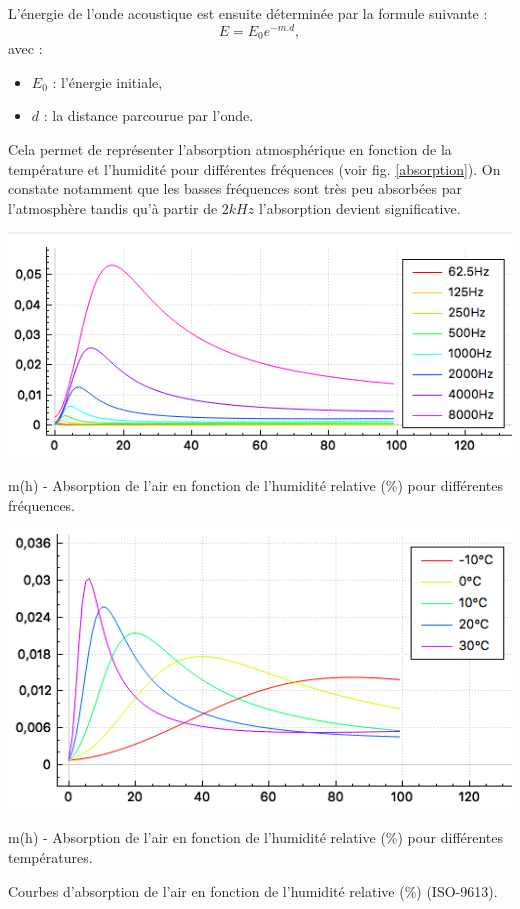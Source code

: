 L'énergie de l'onde acoustique est ensuite déterminée par la formule suivante :
\begin{equation} \label{energie_absAir}
	E = E_0 e^{-m.d},
\end{equation}
avec :
\begin{itemize}
\item $E_0$ : l'énergie initiale,
\item $d$ : la distance parcourue par l'onde.
\end{itemize}
Cela permet de représenter l'absorption atmosphérique en fonction de la température et l'humidité pour différentes fréquences (voir fig. \ref{absorption}). On constate notamment que les basses fréquences sont très peu absorbées par l'atmosphère tandis qu'à partir de $2kHz$ l'absorption devient significative.
%
\begin{figureth}
	\begin{subfigureth}{0.8\linewidth}
		\includegraphics[width=\linewidth]{images/absorption}
		\caption{m(h) - Absorption de l'air en fonction de l'humidité relative (\%) pour différentes fréquences.}
	\end{subfigureth}
	\begin{subfigureth}{0.8\linewidth}
		\includegraphics[width=\linewidth]{images/absorptionbis}
		\caption{m(h) - Absorption de l'air en fonction de l'humidité relative (\%) pour différentes températures.}
	\end{subfigureth}
	\caption{Courbes d'absorption de l'air en fonction de l'humidité relative (\%) (ISO-9613).}
	\label{absorption}
\end{figureth}



